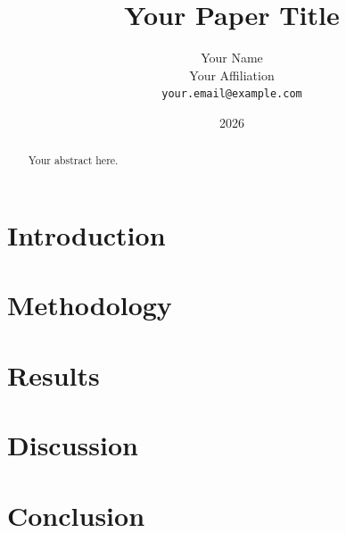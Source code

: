 \documentclass[12pt]{article}
\title{Your Paper Title}
\author{Your Name \\ Your Affiliation \\ \texttt{your.email@example.com}}
\date{2026}
\begin{document}
\maketitle

\begin{abstract}
Your abstract here.
\end{abstract}

\section{Introduction}

\section{Methodology}

\section{Results}

\section{Discussion}

\section{Conclusion}



\end{document}
